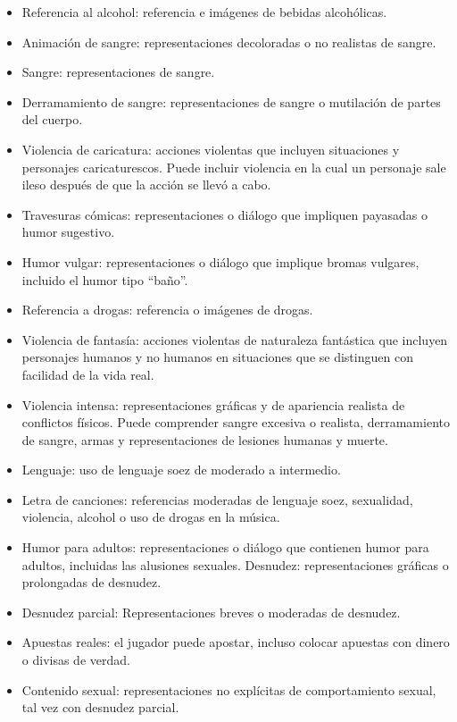 			
			\begin{itemize}
				\item Referencia al alcohol: referencia e imágenes de bebidas alcohólicas.
				\item Animación de sangre: representaciones decoloradas o no realistas de sangre.
				\item Sangre: representaciones de sangre.
				\item Derramamiento de sangre: representaciones de sangre o mutilación de partes del cuerpo.
				\item Violencia de caricatura: acciones violentas que incluyen situaciones y personajes caricaturescos. Puede incluir violencia en la cual un personaje sale ileso después de que la acción se llevó a cabo.
				\item Travesuras cómicas: representaciones o diálogo que impliquen payasadas o humor sugestivo.
				\item Humor vulgar: representaciones o diálogo que implique bromas vulgares, incluido el humor tipo “baño”.
				\item Referencia a drogas: referencia o imágenes de drogas.
				\item Violencia de fantasía: acciones violentas de naturaleza fantástica que incluyen personajes humanos y no humanos en situaciones que se distinguen con facilidad de la vida real.
				\item Violencia intensa: representaciones gráficas y de apariencia realista de conflictos físicos. Puede comprender sangre excesiva o realista, derramamiento de sangre, armas y representaciones de lesiones humanas y muerte.
				\item Lenguaje: uso de lenguaje soez de moderado a intermedio.
				\item Letra de canciones: referencias moderadas de lenguaje soez, sexualidad, violencia, alcohol o uso de drogas en la música.
				\item Humor para adultos: representaciones o diálogo que contienen humor para adultos, incluidas las alusiones sexuales.
				Desnudez: representaciones gráficas o prolongadas de desnudez.
				\item Desnudez parcial: Representaciones breves o moderadas de desnudez.
				\item Apuestas reales: el jugador puede apostar, incluso colocar apuestas con dinero o divisas de verdad.
				\item Contenido sexual: representaciones no explícitas de comportamiento sexual, tal vez con desnudez parcial.

\end{itemize}
